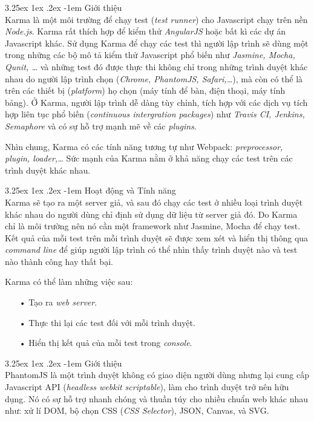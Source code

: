 \documentclass[12pt,a4paper]{article}
\makeatletter
\let\newcounter\@gobble\let\setcounter\@gobbletwo
\newcommand{\myparagraph}[1]{\paragraph{#1}\mbox{}\\} %
\newcounter{subsubsubsection}[subsubsection]
\renewcommand\paragraph{\@startsection{paragraph}{5}{\z@}%
  {3.25ex \@plus1ex \@minus.2ex}%
  {-1em}%
  {\normalfont\normalsize\bfseries}}
\makeatother
\begin{document}
\myparagraph{Giới thiệu}
Karma\cite{karma_1} là một môi trường để chạy test (\textit{test runner}) cho Javascript chạy trên nền \textit{Node.js}. Karma rất thích hợp để kiểm thử \textit{AngularJS} hoặc bất kì các dự án Javascript khác. Sử dụng Karma để chạy các test thì người lập trình sẽ dùng một trong những các bộ mô tả kiểm thử Javascript phổ biến như \textit{Jasmine, Mocha, Qunit, …} và những test đó được thực thi không chỉ trong những trình duyệt khác nhau do người lập trình chọn (\textit{Chrome, PhantomJS, Safari,…}), mà còn có thể là trên các thiết bị (\textit{platform}) họ chọn (máy tính để bàn, điện thoại, máy tính bảng). Ở Karma, người lập trình dễ dàng tùy chỉnh, tích hợp với các dịch vụ tích hợp liên tục phổ biến (\textit{continuous intergration packages}) như \textit{Travis CI, Jenkins, Semaphore} và có sự hỗ trợ mạnh mẽ về các \textit{plugins}.

Nhìn chung, Karma có các tính năng tương tự như Webpack: \textit{preprocessor, plugin, loader,…} Sức mạnh của Karma nằm ở khả năng chạy các test trên các trình duyệt khác nhau. 

\myparagraph{Hoạt động và Tính năng}
Karma sẽ tạo ra một server giả, và sau đó chạy các test ở nhiều loại trình duyệt khác nhau do người dùng chỉ định sử dụng dữ liệu từ server giả đó. Do Karma chỉ là môi trường nên nó cần một framework như Jasmine, Mocha để chạy test. Kết quả của mỗi test trên mỗi trình duyệt sẽ được xem xét và hiển thị thông qua \textit{command line} để giúp người lập trình có thể nhìn thấy trình duyệt nào và test nào thành công hay thất bại.

Karma có thể làm những việc sau:
\begin{itemize}
\item[•] Tạo ra \textit{web server}.
\item[•] Thực thi lại các test đối với mỗi trình duyệt.
\item[•] Hiển thị kết quả của mỗi test trong \textit{console}.
\end{itemize}

\myparagraph{Giới thiệu}
PhantomJS là một trình duyệt không có giao diện người dùng nhưng lại cung cấp Javascript API (\textit{headless webkit scriptable}), làm cho trình duyệt trở nên hữu dụng. Nó có sự hỗ trợ nhanh chóng và thuần túy cho nhiều chuẩn web khác nhau như: xử lí DOM, bộ chọn CSS (\textit{CSS Selector}), JSON, Canvas, và SVG.
\end{document}
